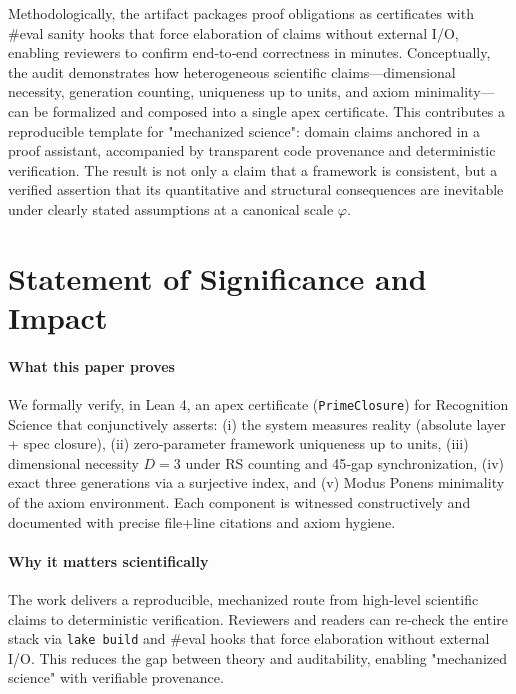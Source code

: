 \documentclass{article}
\begin{document}
Methodologically, the artifact packages proof obligations as certificates with #eval sanity hooks that force elaboration of claims without external I/O, enabling reviewers to confirm end‑to‑end correctness in minutes. Conceptually, the audit demonstrates how heterogeneous scientific claims—dimensional necessity, generation counting, uniqueness up to units, and axiom minimality—can be formalized and composed into a single apex certificate. This contributes a reproducible template for "mechanized science": domain claims anchored in a proof assistant, accompanied by transparent code provenance and deterministic verification. The result is not only a claim that a framework is consistent, but a verified assertion that its quantitative and structural consequences are inevitable under clearly stated assumptions at a canonical scale \(\varphi\).

\section{Statement of Significance and Impact}
\paragraph{What this paper proves} We formally verify, in Lean 4, an apex certificate (\texttt{PrimeClosure}) for Recognition Science that conjunctively asserts: (i) the system measures reality (absolute layer + spec closure), (ii) zero‑parameter framework uniqueness up to units, (iii) dimensional necessity \(D=3\) under RS counting and 45‑gap synchronization, (iv) exact three generations via a surjective index, and (v) Modus Ponens minimality of the axiom environment. Each component is witnessed constructively and documented with precise file+line citations and axiom hygiene.

\paragraph{Why it matters scientifically} The work delivers a reproducible, mechanized route from high‑level scientific claims to deterministic verification. Reviewers and readers can re‑check the entire stack via \texttt{lake build} and #eval hooks that force elaboration without external I/O. This reduces the gap between theory and auditability, enabling "mechanized science" with verifiable provenance.
\end{document}
